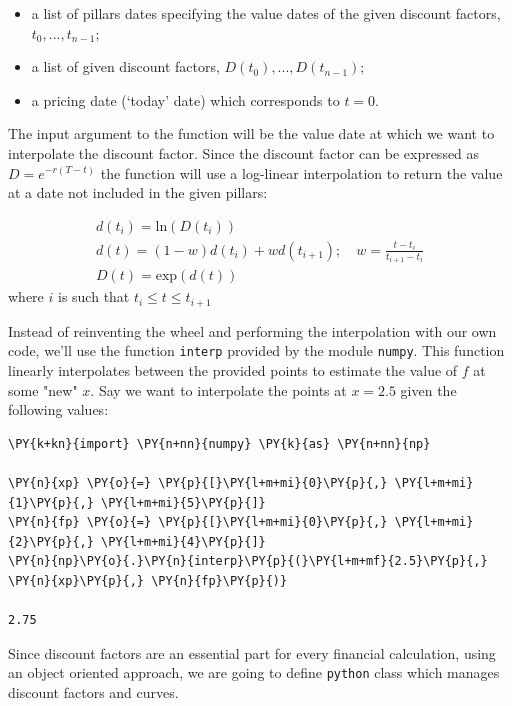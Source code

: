 \begin{itemize}
\tightlist
\item a list of pillars dates specifying the value dates of the given discount factors, \(t_0,...,t_{n-1}\);
\item a list of given discount factors, \(D(t_0),...,D(t_{n-1})\);
\item a pricing date (`today' date) which corresponds to \(t=0\).
\end{itemize}

The input argument to the function will be the value date at which we want to interpolate the discount factor. Since the discount factor can be expressed as \(D=e^{-r(T-t)}\) the function will use a log-linear interpolation to return the value at a date not included in the given pillars:

\begin{equation}
\begin{gathered}
d(t_i)=\mathrm{ln}(D(t_i))\\
d(t) = (1-w)d(t_i) + wd(t_{i+1});\quad w=\frac{t-t_i}{t_{i+1}-t_i}\\
D(t) = \mathrm{exp}(d(t))
\end{gathered}
\end{equation}
where \(i\) is such that \(t_i \le t \le t_{i+1}\)

Instead of reinventing the wheel and performing the interpolation with our own code, 
we'll use the function \texttt{interp} provided by the module \texttt{numpy}. 
This function linearly interpolates between the provided points to estimate the value 
of $f$ at some "new" $x$.
Say we want to interpolate the points at $x = 2.5$ given the following values:

\begin{codebox}
\begin{Verbatim}[commandchars=\\\{\}]
\PY{k+kn}{import} \PY{n+nn}{numpy} \PY{k}{as} \PY{n+nn}{np}

\PY{n}{xp} \PY{o}{=} \PY{p}{[}\PY{l+m+mi}{0}\PY{p}{,} \PY{l+m+mi}{1}\PY{p}{,} \PY{l+m+mi}{5}\PY{p}{]}
\PY{n}{fp} \PY{o}{=} \PY{p}{[}\PY{l+m+mi}{0}\PY{p}{,} \PY{l+m+mi}{2}\PY{p}{,} \PY{l+m+mi}{4}\PY{p}{]}
\PY{n}{np}\PY{o}{.}\PY{n}{interp}\PY{p}{(}\PY{l+m+mf}{2.5}\PY{p}{,} \PY{n}{xp}\PY{p}{,} \PY{n}{fp}\PY{p}{)}

2.75
\end{Verbatim}
\end{codebox}

Since discount factors are an essential part for every financial calculation, using an object
oriented approach, we are going to define \texttt{python} class which manages discount factors
and curves.

